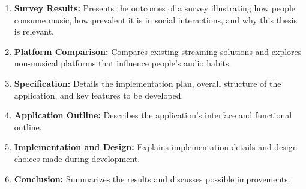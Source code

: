 \begin{enumerate}
    \item \textbf{Survey Results:}
    Presents the outcomes of a survey illustrating how people consume music, how prevalent it is in social interactions, and why this thesis is relevant.

    \item \textbf{Platform Comparison:}
    Compares existing streaming solutions and explores non-musical platforms that influence people’s audio habits.

    \item \textbf{Specification:}
    Details the implementation plan, overall structure of the application, and key features to be developed.

    \item \textbf{Application Outline:}
    Describes the application's interface and functional outline.

    \item \textbf{Implementation and Design:}
    Explains implementation details and design choices made during development.

    \item \textbf{Conclusion:}
    Summarizes the results and discusses possible improvements.
\end{enumerate}